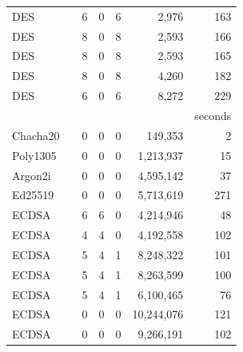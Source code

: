 \begin{table}[]
\begin{tabular}{lrrrrrr}
      DES &         & 6                      & 0                   & 6                    & 2,976         & 163    \\
      DES &         & 8                      & 0                   & 8                    & 2,593         & 166     \\
      DES &           & 8                      & 0                   & 8                    & 2,593        & 165     \\
      DES &            & 8                      & 0                   & 8                    & 4,260         & 182     \\
      DES &       & 6                      & 0                   & 6                    & 8,272         & 229     \\
                         &    &                    &                     &                      &                  & seconds                  \\\cline{6-6}
      Chacha20 &           & 0                      & 0                   & 0                    & 149,353        & 2         \\  
      Poly1305 &          & 0                      & 0                   & 0                    & 1,213,937      & 15     \\
      Argon2i &          & 0                      & 0                   & 0                    & 4,595,142       & 37    \\
      Ed25519 &           & 0                      & 0                   & 0                    & 5,713,619       & 271     \\
      ECDSA &             & 6                      &    6                & 0                    &  4,214,946     &  48    \\ 
      ECDSA &            &   4                   &   4                 & 0                    &  4,192,558    & 102        \\   
      ECDSA &          &  5                    & 4                   & 1                    &  8,248,322       & 101     \\   
      ECDSA &           &  5                    & 4                   & 1                    &  8,263,599      & 100      \\   
      ECDSA &        &  5                    & 4                   & 1                    &  6,100,465       & 76     \\  
      ECDSA &           & 0                      &  0                   &    0               &  10,244,076       &  121      \\  
      ECDSA &          & 0           &  0                   &  0                 &  9,266,191          & 102    \\  



\end{tabular}
\end{table}
